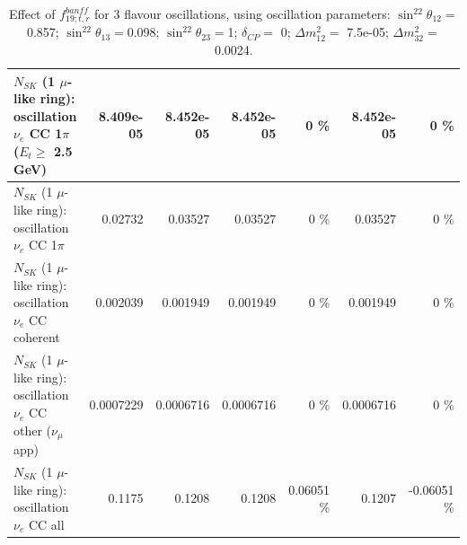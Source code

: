\begin{table}
\begin{tabular}{| l | r | r | r  r | r  r |}
$N_{SK}$ (1 $\mu$-like ring): oscillation $\nu_e$ CC 1$\pi$ ($E_{t} \geq$ 2.5 GeV) &       8.409e-05 &       8.452e-05 &       8.452e-05 &        0 \%  &       8.452e-05 &        0 \%  \\ 
\hline
                     $N_{SK}$ (1 $\mu$-like ring): oscillation $\nu_e$ CC 1$\pi$ &         0.02732 &         0.03527 &         0.03527 &        0 \%  &         0.03527 &        0 \%  \\ 
                   $N_{SK}$ (1 $\mu$-like ring): oscillation $\nu_e$ CC coherent &        0.002039 &        0.001949 &        0.001949 &        0 \%  &        0.001949 &        0 \%  \\ 
      $N_{SK}$ (1 $\mu$-like ring): oscillation $\nu_e$ CC other ($\nu_\mu$ app) &       0.0007229 &       0.0006716 &       0.0006716 &        0 \%  &       0.0006716 &        0 \%  \\ 
                       $N_{SK}$ (1 $\mu$-like ring): oscillation $\nu_e$  CC all &          0.1175 &          0.1208 &          0.1208 &  0.06051 \%  &          0.1207 & -0.06051 \%  \\ 
\hline
\hline
\end{tabular}
\caption{ Effect of $f_{19; t, r}^{banff}$ for 3 flavour oscillations, using oscillation parameters:  $\sin^22\theta_{12} = $0.857; $\sin^22\theta_{13} = $0.098; $\sin^22\theta_{23} = $1; $\delta_{CP} = $        0; $\Delta m^2_{12} = $    7.5e-05; $\Delta m^2_{32} = $    0.0024. }
\label{tab:num_banff_ccqeE1_1RmuT_3f_osc_t13:0.098}
\end{table}
\clearpage
